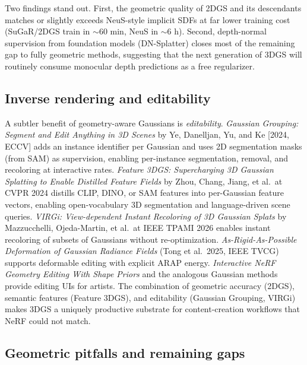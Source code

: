 \documentclass{article}
\begin{document}
Two findings stand out. First, the geometric quality of 2DGS and its descendants matches or slightly exceeds NeuS-style implicit SDFs at far lower training cost (SuGaR/2DGS train in \(\sim 60\) min, NeuS in \(\sim 6\) h). Second, depth-normal supervision from foundation models (DN-Splatter) closes most of the remaining gap to fully geometric methods, suggesting that the next generation of 3DGS will routinely consume monocular depth predictions as a free regularizer.

\subsection{Inverse rendering and editability}\label{inverse-rendering-and-editability}

A subtler benefit of geometry-aware Gaussians is \emph{editability}. \emph{Gaussian Grouping: Segment and Edit Anything in 3D Scenes} by Ye, Danelljan, Yu, and Ke {[}2024, ECCV{]} adds an instance identifier per Gaussian and uses 2D segmentation masks (from SAM) as supervision, enabling per-instance segmentation, removal, and recoloring at interactive rates. \emph{Feature 3DGS: Supercharging 3D Gaussian Splatting to Enable Distilled Feature Fields} by Zhou, Chang, Jiang, et al.~at CVPR 2024 \cite{zhou2024drivinggaussiancom} distills CLIP, DINO, or SAM features into per-Gaussian feature vectors, enabling open-vocabulary 3D segmentation and language-driven scene queries. \emph{VIRGi: View-dependent Instant Recoloring of 3D Gaussian Splats} by Mazzucchelli, Ojeda-Martin, et al.~at IEEE TPAMI 2026 enables instant recoloring of subsets of Gaussians without re-optimization. \emph{As-Rigid-As-Possible Deformation of Gaussian Radiance Fields} (Tong et al.~2025, IEEE TVCG) supports deformable editing with explicit ARAP energy. \emph{Interactive NeRF Geometry Editing With Shape Priors} and the analogous Gaussian methods provide editing UIs for artists. The combination of geometric accuracy (2DGS), semantic features (Feature 3DGS), and editability (Gaussian Grouping, VIRGi) makes 3DGS a uniquely productive substrate for content-creation workflows that NeRF could not match.

\subsection{Geometric pitfalls and remaining gaps}\label{geometric-pitfalls-and-remaining-gaps}
\end{document}
